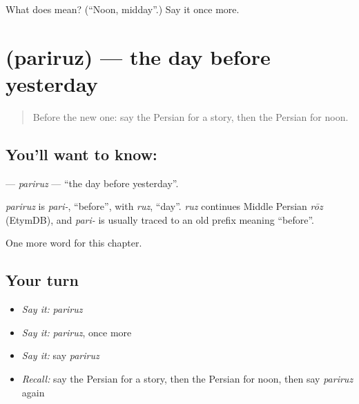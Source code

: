 \begin{tcolorbox}[breakable,colback=teal!4,colframe=teal!35!black,title={Before you move on}]
What does  mean? (\textquotedblleft{}Noon, midday\textquotedblright{}.) Say it once more.
\end{tcolorbox}
\section[\texorpdfstring{\fa{پریروز} (pariruz)}{پریروز (pariruz)}]{ (pariruz) — the day before yesterday}

\label{lesson:FA-C79-pariruz}



\begin{quote}
Before the new one: say the Persian for a story, then the Persian for noon.
\end{quote}

\subsection*{You'll want to know: }
\textbf{} — \emph{pariruz} — \textquotedblleft{}the day before yesterday\textquotedblright{}.

\begin{cousinweb}
\emph{pariruz} is \emph{pari-}, \textquotedblleft{}before\textquotedblright{}, with \emph{ruz}, \textquotedblleft{}day\textquotedblright{}. \emph{ruz} continues Middle Persian \emph{rōz} (EtymDB), and \emph{pari-} is usually traced to an old prefix meaning \textquotedblleft{}before\textquotedblright{}.
\end{cousinweb}

\begin{grammarlens}[title={What you've built}]
One more word for this chapter.
\end{grammarlens}

\subsection*{Your turn}
\begin{itemize}
\raggedright
  \item \emph{Say it:} \emph{pariruz}
  \item \emph{Say it:} \emph{pariruz}, once more
  \item \emph{Say it:} say \emph{pariruz}
  \item \emph{Recall:} say the Persian for a story, then the Persian for noon, then say \emph{pariruz} again
\end{itemize}

